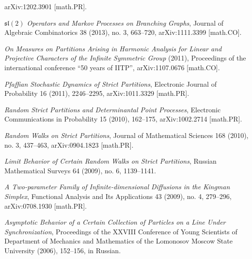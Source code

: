 \documentclass[letterpaper,11pt]{article}
\begin{document}
\begin{etaremune}
    arXiv:1202.3901 [math.PR].
    \item \emph{$\mathfrak{sl}(2)$ Operators and Markov Processes on Branching Graphs},
    Journal of Algebraic Combinatorics 38 (2013), no. 3, 663--720,
    arXiv:1111.3399 [math.CO].
    \item \emph{On Measures on Partitions Arising in Harmonic Analysis for Linear and Projective Characters of the Infinite Symmetric Group} (2011), Proceedings of the international conference ``50 years of IITP'', arXiv:1107.0676 [math.CO].
    \item  \emph{Pfaffian Stochastic Dynamics of Strict Partitions},  Electronic Journal of Probability 16 (2011), 2246--2295, arXiv:1011.3329 [math.PR].
    \item \emph{Random Strict Partitions and Determinantal Point Processes}, Electronic Communications in Probability 15 (2010), 162--175, arXiv:1002.2714 [math.PR].
    \item  \emph{Random Walks on Strict Partitions}, Journal of Mathematical Sciences 168 (2010), no. 3, 437--463, arXiv:0904.1823 [math.PR].  
    \item  \emph{Limit Behavior of Certain Random Walks on Strict Partitions}, Russian Mathematical Surveys 64 (2009), no. 6, 1139--1141.
    \item  \emph{A Two-parameter Family of Infinite-dimensional Diffusions in the Kingman Simplex}, Functional Analysis and Its Applications 43 (2009), no. 4, 279--296, arXiv:0708.1930 [math.PR].
     \item 
    \emph{Asymptotic Behavior of a Certain Collection of Particles on a Line Under Synchronization}, Proceedings of the XXVIII Conference of Young Scientists of Department of Mechanics and Mathematics of the Lomonosov Moscow State University (2006), 152--156, in Russian.
\end{etaremune}
\end{document}
